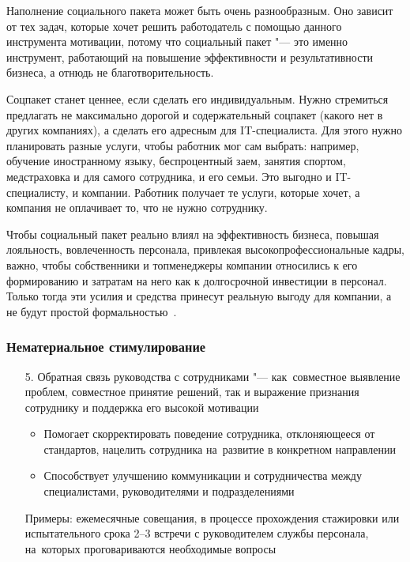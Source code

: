 \documentclass{../industrial-development}
\begin{document}
\lecturenotes
	
Наполнение социального пакета может быть очень разнообразным. Оно зависит от тех задач, которые хочет решить работодатель с помощью данного инструмента мотивации, потому что социальный пакет "--- это именно инструмент, работающий на повышение эффективности и результативности бизнеса, а отнюдь не благотворительность.
		
Соцпакет станет ценнее, если сделать его индивидуальным. Нужно стремиться предлагать не максимально дорогой и содержательный соцпакет (какого нет в других компаниях), а сделать его адресным для IT-специалиста. Для этого нужно планировать разные услуги, чтобы работник мог сам выбрать: например, обучение иностранному языку, беспроцентный заем, занятия спортом, медстраховка и для самого сотрудника, и его семьи. Это выгодно и IT-специалисту, и компании. Работник получает те услуги, которые хочет, а компания не оплачивает то, что не нужно сотруднику.

Чтобы социальный пакет реально влиял на эффективность бизнеса, повышая лояльность, вовлеченность персонала, привлекая высокопрофессиональные кадры, важно, чтобы собственники и топ­менеджеры компании относились к его формированию и затратам на него как к долгосрочной инвестиции в персонал. Только тогда эти усилия и средства принесут реальную выгоду для компании, а не будут простой формальностью~\cite{VchemosobenIT}.

\begin{frame} \frametitle{Нематериальное стимулирование}

  \begin{itemize}
		\item[5.] \alert{Обратная связь руководства с сотрудниками} "--- как~совместное выявление проблем, совместное принятие решений, так и выражение признания сотруднику и поддержка его высокой мотивации
		 \begin{itemize}
		\item Помогает скорректировать поведение сотрудника, отклоняющееся от стандартов, нацелить сотрудника на~развитие в конкретном направлении
	\item Способствует улучшению коммуникации и сотрудничества между специалистами, руководителями и подразделениями
		\end{itemize}
Примеры: ежемесячные совещания, в процессе прохождения стажировки или испытательного срока 2--3 встречи с руководителем службы персонала, на~которых проговариваются необходимые вопросы
	  \end{itemize}
\end{frame}
\end{document}
